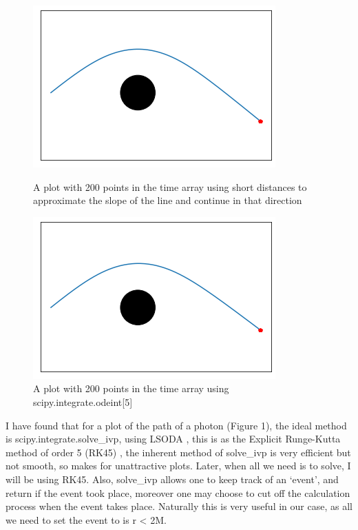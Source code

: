 \documentclass[oneside,openright,frontopenright]{dmathesis}
\begin{document}
\begin{figure}
	\centering
	\begin{minipage}[b]{0.6\textwidth}
		\includegraphics[width=\textwidth]{img/points200byhand}
		\caption{A plot with 200 points in the time array using short distances to approximate the slope of the line and continue in that direction}
	\end{minipage}
	\hfill
	\begin{minipage}[b]{0.6\textwidth}
		\includegraphics[width=\textwidth]{img/points200scipy}
		\caption{A plot with 200 points in the time array using scipy.integrate.odeint[5]}
	\end{minipage}
\end{figure}


	I have found that for a plot of the path of a photon (Figure 1), the ideal method is scipy.integrate.solve\_ivp, using LSODA \cite{hindmarsh2005lsoda}, this is as the Explicit Runge-Kutta method of order 5 (RK45) \cite{fehlberg1969low}, the inherent method of solve\_ivp is very efficient but not smooth, so makes for unattractive plots. Later, when all we need is to solve, I will be using RK45. Also, solve\_ivp allows one to keep track of an ‘event’, and return if the event took place, moreover one may choose to cut off the calculation process when the event takes place. Naturally this is very useful in our case, as all we need to set the event to is r < 2M.
\end{document}
